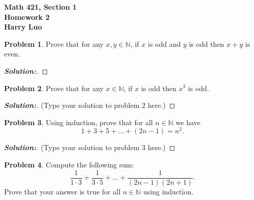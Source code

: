 \documentclass[12pt]{article}
\theoremstyle{definition}\newtheorem{problem}{Problem}
\newenvironment{solution}{\begin{proof}[\bfseries\textup{Solution:}]}{\end{proof}}
\begin{document}

\begin{center}
\bfseries Math 421, Section 1 
\\ 
Homework 2
\\ 
Harry Luo %
\\ [24pt] 
\end{center}

\begin{problem}
Prove that for any $x,y\in\mathbb{N}$, if $x$ is odd and $y$ is odd then $x+y$ is even.
\end{problem}

\begin{solution}

\end{solution}

\newpage
\begin{problem}
Prove that for any $x\in\mathbb{N}$, if $x$ is odd then $x^3$ is odd.
\end{problem}

\begin{solution}
(Type your solution to problem 2 here.)
\end{solution}

\newpage
\begin{problem}
Using induction, prove that for all $n\in\mathbb{N}$ we have
\begin{equation*}
1+3+5+\dots+(2n-1) = n^2 .
\end{equation*}
\end{problem}

\begin{solution}
(Type your solution to problem 3 here.)
\end{solution}

\newpage
\begin{problem}
Compute the following sum:
\begin{equation*}
\frac{1}{1\cdot 3} + \frac{1}{3\cdot 5} + \dots + \frac{1}{(2n-1)(2n+1)} .
\end{equation*}
Prove that your answer is true for all $n\in\mathbb{N}$ using induction.
\end{problem}
\end{document}
